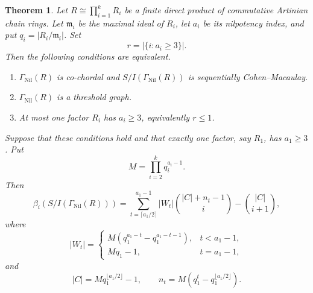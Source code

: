 \documentclass[12pt, reqno]{amsart}
\newtheorem{theorem}{Theorem}[section]
\theoremstyle{definition}
\numberwithin{equation}{section}
\begin{document}
\begin{theorem}\label{thm:master_nilpotent}
Let $R\cong\prod_{i=1}^{k}R_i$ be a finite direct product of commutative Artinian chain rings.  Let $\mathfrak m_i$ be the maximal ideal of $R_i$, let $a_i$ be its nilpotency index, and put $q_i=|R_i/\mathfrak m_i|$.  Set
\[
r=\bigl|\{i:a_i\ge3\}\bigr|.
\]
Then the following conditions are equivalent.
\begin{enumerate}
\item $\Gamma_{\operatorname{Nil}}(R)$ is co-chordal and $S/I(\Gamma_{\operatorname{Nil}}(R))$ is sequentially Cohen--Macaulay.
\item $\Gamma_{\operatorname{Nil}}(R)$ is a threshold graph.
\item At most one factor $R_i$ has $a_i\ge3$, equivalently $r\le1$.
\end{enumerate}

Suppose that these conditions hold and that exactly one factor, say $R_1$, has $a_1\ge3$.  Put
\[
M=\prod_{i=2}^{k}q_i^{a_i-1}.
\]
Then
\begin{equation}\label{eq:nil_product}
\beta_i(S/I(\Gamma_{\operatorname{Nil}}(R)))
=
\sum_{t=\lceil a_1/2\rceil}^{a_1-1}|W_t|
\binom{|C|+n_t-1}{i}
-
\binom{|C|}{i+1},
\end{equation}
where
\[
|W_t|=
\begin{cases}
M(q_1^{a_1-t}-q_1^{a_1-t-1}),&t<a_1-1,\\
Mq_1-1,&t=a_1-1,
\end{cases}
\]
and
\[
|C|=Mq_1^{\lfloor a_1/2\rfloor}-1,
\qquad
n_t=M(q_1^t-q_1^{\lfloor a_1/2\rfloor}).
\]
\end{theorem}
\end{document}
